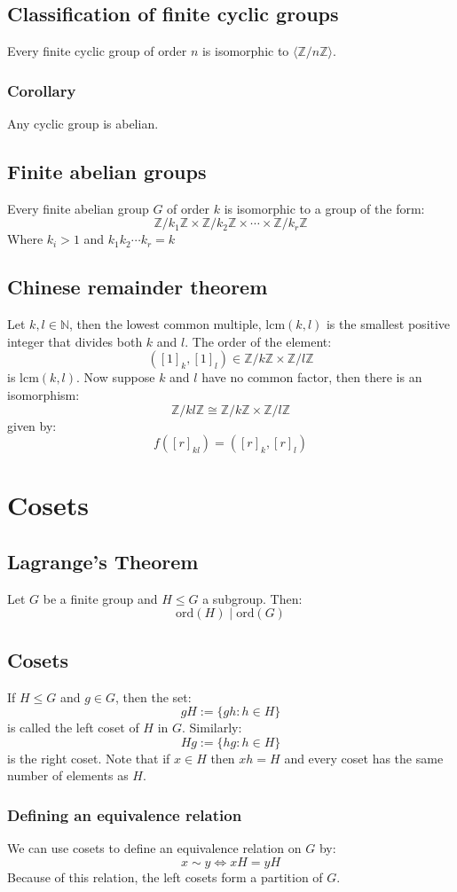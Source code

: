 \documentclass[12pt]{article}
\begin{document}
\subsection*{Classification of finite cyclic groups}
Every finite cyclic group of order \(n\) is isomorphic to \(\langle\mathbb{Z}/n\mathbb{Z}\rangle\).
\subsubsection*{Corollary}
Any cyclic group is abelian.
\subsection*{Finite abelian groups}
Every finite abelian group \(G\) of order \(k\) is isomorphic to a group of the form:
\[\mathbb{Z}/k_1\mathbb{Z}\times\mathbb{Z}/k_2\mathbb{Z}\times\cdots\times\mathbb{Z}/k_r\mathbb{Z}\]
Where \(k_i>1\) and \(k_1k_2\cdots k_r=k\)
\subsection*{Chinese remainder theorem}
Let \(k,l\in\mathbb{N}\), then the lowest common multiple, lcm\((k,l)\) is the smallest positive integer that divides both \(k\) and \(l\). The order of the element:
\[([1]_k,[1]_l)\in \mathbb{Z}/k\mathbb{Z}\times \mathbb{Z}/l\mathbb{Z}\]
is lcm\((k,l)\). Now suppose \(k\) and \(l\) have no common factor, then there is an isomorphism:
\[\mathbb{Z}/kl\mathbb{Z}\cong\mathbb{Z}/k\mathbb{Z}\times\mathbb{Z}/l\mathbb{Z}\]
given by:
\[f([r]_{kl})=([r]_k,[r]_l)\]
\section{Cosets}
\subsection*{Lagrange's Theorem}
Let \(G\) be a finite group and \(H\leqslant G\) a subgroup. Then:
\[\text{ord}(H)\mid \text{ord}(G)\]
\subsection*{Cosets}
If \(H\leqslant G\) and \(g\in G\), then the set:
\[gH:=\{gh:h\in H\}\]
is called the left coset of \(H\) in \(G\). Similarly:
\[Hg:=\{hg:h\in H\}\]
is the right coset. Note that if \(x\in H\) then \(xh=H\) and every coset has the same number of elements as \(H\).
\subsubsection*{Defining an equivalence relation}
We can use cosets to define an equivalence relation on \(G\) by:
\[x\sim y\iff xH=yH\]
Because of this relation, the left cosets form a partition of \(G\).
\end{document}
